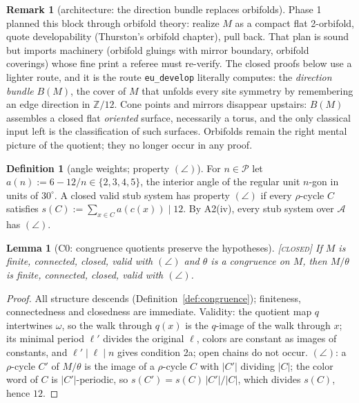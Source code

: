 \documentclass[11pt]{article}
\newtheorem{lemma}[theorem]{Lemma}
\theoremstyle{definition}
\newtheorem{definition}[theorem]{Definition}
\newtheorem{remark}[theorem]{Remark}
\newcommand{\CLOSED}{\textnormal{\textsc{[closed]}}}
\newcommand{\A}{\mathcal{A}}
\newcommand{\Z}{\mathbb{Z}}
\begin{document}
\begin{remark}[architecture: the direction bundle replaces orbifolds]\label{rem:bundle-arch}
Phase 1 planned this block through orbifold theory: realize $M$ as a compact flat
2-orbifold, quote developability (Thurston's orbifold chapter), pull back. That plan is
sound but imports machinery (orbifold gluings with mirror boundary, orbifold coverings)
whose fine print a referee must re-verify. The closed proofs below use a lighter route,
and it is the route \texttt{eu\_develop} literally computes: the \emph{direction bundle}
$B(M)$, the cover of $M$ that unfolds every site symmetry by remembering an edge
direction in $\Z/12$. Cone points and mirrors disappear upstairs: $B(M)$ assembles a
closed flat \emph{oriented} surface, necessarily a torus, and the only classical input
left is the classification of such surfaces. Orbifolds remain the right mental picture
of the quotient; they no longer occur in any proof.
\end{remark}

\begin{definition}[angle weights; property $(\angle)$]\label{def:angle}
For $n \in \mathcal{P}$ let $a(n) := 6 - 12/n \in \{2,3,4,5\}$, the interior angle of
the regular unit $n$-gon in units of $30^\circ$. A closed valid stub system has property
$(\angle)$ if every $\rho$-cycle $C$ satisfies
$s(C) := \sum_{x \in C} a(c(x)) \mid 12$. By A2(iv), every stub system over $\A$ has
$(\angle)$.
\end{definition}

\begin{lemma}[C0: congruence quotients preserve the hypotheses]\label{lem:C0} \CLOSED\;
If $M$ is finite, connected, closed, valid with $(\angle)$ and $\theta$ is a congruence
on $M$, then $M/\theta$ is finite, connected, closed, valid with $(\angle)$.
\end{lemma}

\begin{proof}
All structure descends (Definition~\ref{def:congruence}); finiteness, connectedness and
closedness are immediate. Validity: the quotient map $q$ intertwines $\omega$, so the
walk through $q(x)$ is the $q$-image of the walk through $x$; its minimal period $\ell'$
divides the original $\ell$, colors are constant as images of constants, and
$\ell' \mid \ell \mid n$ gives condition 2a; open chains do not occur. $(\angle)$: a
$\rho$-cycle $C'$ of $M/\theta$ is the image of a $\rho$-cycle $C$ with $|C'|$ dividing
$|C|$; the color word of $C$ is $|C'|$-periodic, so
$s(C') = s(C)\,|C'|/|C|$, which divides $s(C)$, hence $12$.
\end{proof}
\end{document}
